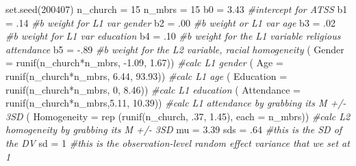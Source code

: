 \documentclass[
  11pt,
]{book}
\newenvironment{Shaded}{\begin{snugshade}}{\end{snugshade}}
\newcommand{\AttributeTok}[1]{\textcolor[rgb]{0.77,0.63,0.00}{#1}}
\newcommand{\CommentTok}[1]{\textcolor[rgb]{0.56,0.35,0.01}{\textit{#1}}}
\newcommand{\DecValTok}[1]{\textcolor[rgb]{0.00,0.00,0.81}{#1}}
\newcommand{\FloatTok}[1]{\textcolor[rgb]{0.00,0.00,0.81}{#1}}
\newcommand{\FunctionTok}[1]{\textcolor[rgb]{0.00,0.00,0.00}{#1}}
\newcommand{\NormalTok}[1]{#1}
\newcommand{\OtherTok}[1]{\textcolor[rgb]{0.56,0.35,0.01}{#1}}
\newcommand{\SpecialCharTok}[1]{\textcolor[rgb]{0.00,0.00,0.00}{#1}}
\begin{document}
\begin{Shaded}
\begin{Highlighting}[]
\FunctionTok{set.seed}\NormalTok{(}\DecValTok{200407}\NormalTok{)}
\NormalTok{n\_church }\OtherTok{=} \DecValTok{15}
\NormalTok{n\_mbrs }\OtherTok{=} \DecValTok{15}
\NormalTok{b0 }\OtherTok{=} \FloatTok{3.43} \CommentTok{\#intercept for ATSS}
\NormalTok{b1 }\OtherTok{=}\NormalTok{ .}\DecValTok{14} \CommentTok{\#b weight for L1 var gender}
\NormalTok{b2 }\OtherTok{=}\NormalTok{ .}\DecValTok{00} \CommentTok{\#b weight or L1 var age}
\NormalTok{b3 }\OtherTok{=}\NormalTok{ .}\DecValTok{02} \CommentTok{\#b weight for L1 var education}
\NormalTok{b4 }\OtherTok{=}\NormalTok{ .}\DecValTok{10} \CommentTok{\#b weight for the L1 variable religious attendance}
\NormalTok{b5 }\OtherTok{=} \SpecialCharTok{{-}}\NormalTok{.}\DecValTok{89} \CommentTok{\#b weight for the L2 variable, racial homogeneity}
\NormalTok{( }\AttributeTok{Gender =} \FunctionTok{runif}\NormalTok{(n\_church}\SpecialCharTok{*}\NormalTok{n\_mbrs, }\SpecialCharTok{{-}}\FloatTok{1.09}\NormalTok{, }\FloatTok{1.67}\NormalTok{)) }\CommentTok{\#calc L1 gender}
\NormalTok{( }\AttributeTok{Age =} \FunctionTok{runif}\NormalTok{(n\_church}\SpecialCharTok{*}\NormalTok{n\_mbrs, }\FloatTok{6.44}\NormalTok{, }\FloatTok{93.93}\NormalTok{)) }\CommentTok{\#calc L1 age}
\NormalTok{( }\AttributeTok{Education =} \FunctionTok{runif}\NormalTok{(n\_church}\SpecialCharTok{*}\NormalTok{n\_mbrs, }\DecValTok{0}\NormalTok{, }\FloatTok{8.46}\NormalTok{)) }\CommentTok{\#calc L1 education}
\NormalTok{( }\AttributeTok{Attendance =} \FunctionTok{runif}\NormalTok{(n\_church}\SpecialCharTok{*}\NormalTok{n\_mbrs,}\FloatTok{5.11}\NormalTok{, }\FloatTok{10.39}\NormalTok{)) }\CommentTok{\#calc L1 attendance by grabbing  its M +/{-} 3SD}
\NormalTok{( }\AttributeTok{Homogeneity =} \FunctionTok{rep}\NormalTok{ (}\FunctionTok{runif}\NormalTok{(n\_church, .}\DecValTok{37}\NormalTok{, }\FloatTok{1.45}\NormalTok{), }\AttributeTok{each =}\NormalTok{ n\_mbrs)) }\CommentTok{\#calc L2 homogeneity by grabbing  its M +/{-} 3SD}
\NormalTok{mu }\OtherTok{=} \FloatTok{3.39} 
\NormalTok{sds }\OtherTok{=}\NormalTok{ .}\DecValTok{64} \CommentTok{\#this is the SD of the DV}
\NormalTok{sd }\OtherTok{=} \DecValTok{1} \CommentTok{\#this is the observation{-}level random effect variance that we set at 1}


\end{Highlighting}
\end{Shaded}
\end{document}
